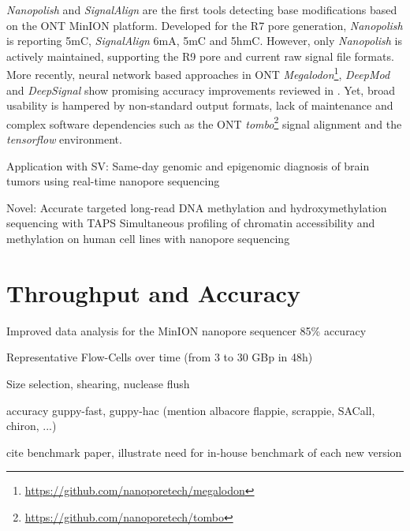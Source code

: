
\textit{Nanopolish} \cite{Simpson2017} and \textit{SignalAlign} \cite{Rand2017} are the first tools detecting base modifications based on the ONT MinION platform.
Developed for the R7 pore generation, \textit{Nanopolish} is reporting 5mC, \textit{SignalAlign} 6mA, 5mC and 5hmC.
However, only \textit{Nanopolish} is actively maintained, supporting the R9 pore and current raw signal file formats.
More recently, neural network based approaches in ONT \textit{Megalodon}\footnote{\url{https://github.com/nanoporetech/megalodon}}, \textit{DeepMod} \cite{Liu2019a} and \textit{DeepSignal} \cite{Ni2018} show promising accuracy improvements reviewed in \cite{Yuen2020}.
Yet, broad usability is hampered by non-standard output formats, lack of maintenance and complex software dependencies such as the ONT \textit{tombo}\footnote{\url{https://github.com/nanoporetech/tombo}} signal alignment and the \textit{tensorflow} environment.


Application with SV:
Same-day genomic and epigenomic diagnosis of brain tumors using real-time nanopore sequencing \cite{Euskirchen2017}

Novel:
Accurate targeted long-read DNA methylation and hydroxymethylation sequencing with TAPS \cite{Liu2020}
Simultaneous profiling of chromatin accessibility and methylation on human cell lines with nanopore sequencing \cite{Lee2020}




\section{Throughput and Accuracy}
\label{sec:stat_of_art:throughput}

Improved data analysis for the {MinION} nanopore sequencer \cite{Jain2015} 85\% accuracy

Representative Flow-Cells over time (from 3 to 30 GBp in 48h)

Size selection, shearing, nuclease flush

accuracy guppy-fast, guppy-hac (mention albacore flappie, scrappie, SACall, chiron, ...)

cite benchmark paper, illustrate need for in-house benchmark of each new version

